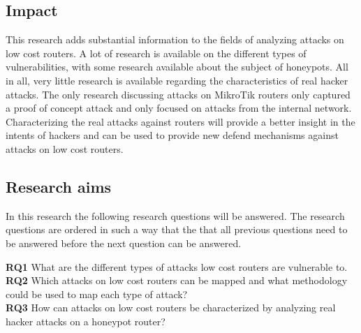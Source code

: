\subsection{Impact}
This research adds substantial information to the fields of analyzing attacks on low cost routers. A lot of research is available on the different types of vulnerabilities, with some research available about the subject of honeypots. All in all, very little research is available regarding the characteristics of real hacker attacks. The only research discussing attacks on MikroTik routers \cite{ROUTEROSFORENSICS:IJCSIS:2017} only captured a proof of concept attack and only focused on attacks from the internal network. Characterizing the real attacks against routers will provide a better insight in the intents of hackers and can be used to provide new defend mechanisms against attacks on low cost routers.

\subsection{Research aims}
In this research the following research questions will be answered. The research questions are ordered in such a way that the that all previous questions need to be answered before the next question can be answered.

\textbf{RQ1} What are the different types of attacks low cost routers are vulnerable to.\\
\textbf{RQ2} Which attacks on low cost routers can be mapped and what methodology could be used to map each type of attack?\\
\textbf{RQ3} How can attacks on low cost routers be characterized by analyzing real hacker attacks on a honeypot router?


